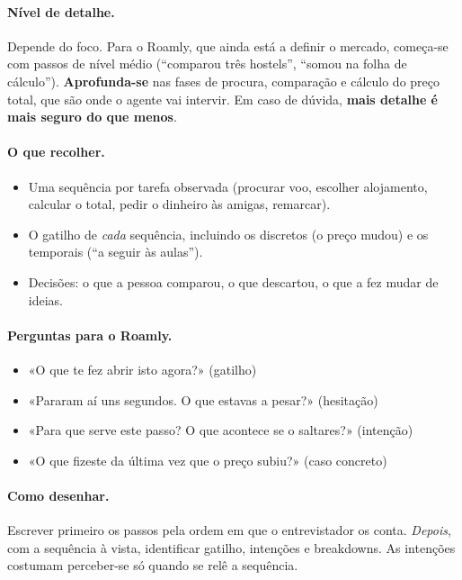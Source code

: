 \documentclass[11pt,a4paper]{article}
\begin{document}
\paragraph{Nível de detalhe.} Depende do foco. Para o Roamly, que ainda está a definir o mercado, começa-se com passos de nível médio (``comparou três hostels'', ``somou na folha de cálculo''). \textbf{Aprofunda-se} nas fases de procura, comparação e cálculo do preço total, que são onde o agente vai intervir. Em caso de dúvida, \textbf{mais detalhe é mais seguro do que menos}.

\paragraph{O que recolher.}
\begin{itemize}
  \item Uma sequência por tarefa observada (procurar voo, escolher alojamento, calcular o total, pedir o dinheiro às amigas, remarcar).
  \item O gatilho de \emph{cada} sequência, incluindo os discretos (o preço mudou) e os temporais (``a seguir às aulas'').
  \item Decisões: o que a pessoa comparou, o que descartou, o que a fez mudar de ideias.
\end{itemize}

\paragraph{Perguntas para o Roamly.}
\begin{itemize}
  \item «O que te fez abrir isto agora?» (gatilho)
  \item «Pararam aí uns segundos. O que estavas a pesar?» (hesitação)
  \item «Para que serve este passo? O que acontece se o saltares?» (intenção)
  \item «O que fizeste da última vez que o preço subiu?» (caso concreto)
\end{itemize}

\paragraph{Como desenhar.} Escrever primeiro os passos pela ordem em que o entrevistador os conta. \emph{Depois}, com a sequência à vista, identificar gatilho, intenções e breakdowns. As intenções costumam perceber-se só quando se relê a sequência.
\end{document}
